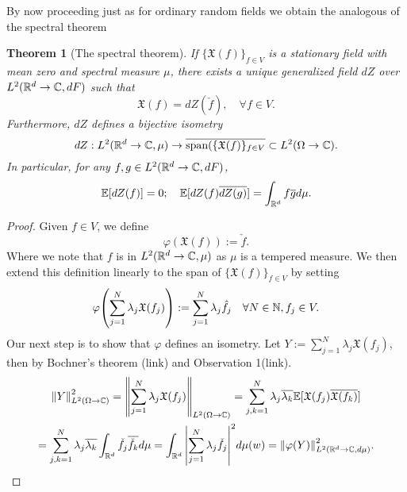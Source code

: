 \documentclass[12pt]{article}
\newtheorem{theorem}{Theorem}
\begin{document}
\begin{CJK*}{UTF8}{gbsn}
	By now proceeding just as for ordinary random fields we obtain the analogous of the spectral theorem
	\begin{theorem}[The spectral theorem]\label{spectral theorem}
		If $\{\mathfrak{X}(f)\}_{f\in V}$ is a stationary field with mean zero and spectral measure $\mu $, there exists a unique generalized field $dZ$ over $L^2({\mathbb R}^d\to\mathbb{C},dF)$ such that
		\begin{equation}\label{spectral representation}
			\mathfrak{X}(f)=dZ(\check{f}),\quad\forall f\in V.
		\end{equation}
		Furthermore, $dZ$ defines a bijective isometry
		\begin{equation*}
			dZ:L^2({\mathbb R}^d\to\mathbb{C},\mu )\to\overline{\text{span}(\{\mathfrak{X} (f)\}_{f\in V}}\subset L^2(\Omega\to\mathbb{C}).
		\end{equation*}
		In particular, for any $f,g\in L^2({\mathbb R}^d\to\mathbb{C},dF)$,
		\begin{equation}\label{dZ properties}
			\mathbb{E}[dZ(f)]=0;\quad \mathbb{E}[dZ(f)\overline{dZ(g)}]=\int_{{\mathbb R}^d} f\overline{g}d\mu  .
		\end{equation}
	\end{theorem}
	\begin{proof}
		Given $f\in  V$, we define
		\begin{equation}\label{constr phi}
			\varphi(\mathfrak{X} (f)):=\check{f}.
		\end{equation}
		Where we note that $f$ is in $L^2({\mathbb R}^d\to\mathbb{C},\mu)$ as $\mu $ is a tempered measure. We then extend this definition linearly to the span of $\{\mathfrak{X} (f)\}_{f\in V}$ by setting
		\begin{equation*}
			\varphi\qty(\sum_{j=1}^N\lambda_j \mathfrak{X} (f_j)):=\sum_{j=1}^N\lambda_j \hat{f}_j\quad\forall N\in \mathbb{N},f_j\in V.
		\end{equation*}
		Our next step is to show that $\varphi$ defines an isometry. Let $Y:=\sum_{j=1}^N\lambda_j \mathfrak{X} (f_j)$, then by Bochner's theorem (link) and Observation 1(link).
		\begin{multline*}
			\norm{Y}_{L^2(\Omega\to\mathbb{C})}^2 =\norm{\sum_{j=1}^N\lambda_j \mathfrak{X} (f_j)}_{L^2(\Omega\to\mathbb{C})}=\sum_{j,k=1}^N\lambda_j\overline{\lambda_k} \mathbb{E}[\mathfrak{X} (f_j)\overline{\mathfrak{X} (f_k)}]\\
			=\sum_{j,k=1}^N\lambda_j\overline{\lambda_k} \int_{{\mathbb R}^d}\check{f}_j\overline{\check{f}_k} d\mu = \int_{{\mathbb R}^d}\abs{\sum_{j=1}^N\lambda_j \check{f}_j}^2d \mu (w)=\norm{\varphi(Y)}_{L^2({\mathbb R}^d\to\mathbb{C},d\mu )}^2.
		\end{multline*}

\end{proof}
\end{CJK*}
\end{document}
